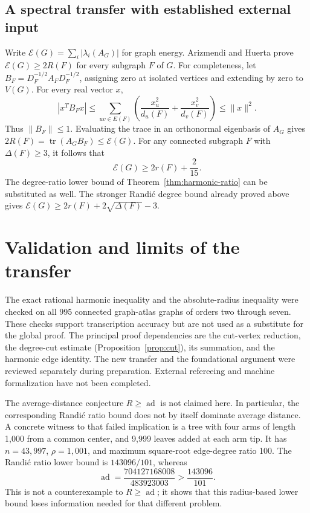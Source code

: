 \documentclass[11pt,a4paper]{article}
\begin{document}
\subsection{A spectral transfer with established external input}
Write $\mathcal E(G)=\sum_i|\lambda_i(A_G)|$ for graph energy.
Arizmendi and Huerta \cite{AH} prove
$\mathcal E(G)\ge2R(F)$ for every subgraph $F$ of $G$.
For completeness, let $B_F=D_F^{-1/2}A_FD_F^{-1/2}$, assigning
zero at isolated vertices and extending by zero to $V(G)$.
For every real vector $x$,
\[
|x^TB_Fx|\le\sum_{uv\in E(F)}
\left(\frac{x_u^2}{d_u(F)}+\frac{x_v^2}{d_v(F)}\right)
\le\|x\|^2.
\]
Thus $\|B_F\|\le1$. Evaluating the trace in an orthonormal
eigenbasis of $A_G$ gives
$2R(F)=\operatorname{tr}(A_GB_F)\le\mathcal E(G)$.
For any connected subgraph $F$ with $\Delta(F)\ge3$, it follows that
\[
\mathcal E(G)\ge2r(F)+\frac2{15}.
\]
The degree-ratio lower bound of Theorem~\ref{thm:harmonic-ratio}
can be substituted as well. The stronger Randi\'c degree bound
already proved above gives
$\mathcal E(G)\ge2r(F)+2\sqrt{\Delta(F)}-3$.

\section{Validation and limits of the transfer}
The exact rational harmonic inequality and the absolute-radius
inequality were checked on all 995 connected graph-atlas graphs
of orders two through seven. These checks support transcription
accuracy but are not used as a substitute for the global proof.
The principal proof dependencies are the cut-vertex reduction,
the degree-cut estimate (Proposition~\ref{prop:cut}), its summation,
and the harmonic edge identity. The new transfer and the foundational
argument were reviewed separately during preparation. External
refereeing and machine formalization have not been completed.

The average-distance conjecture $R\ge\operatorname{ad}$ is not
claimed here. In particular, the corresponding Randi\'c ratio bound
does not by itself dominate average distance. A concrete witness
to that failed implication is a tree with four arms of length 1,000
from a common center, and 9,999 leaves added at each arm tip.
It has $n=43,997$, $\rho=1,001$, and maximum square-root edge-degree
ratio 100. The Randi\'c ratio lower bound is $143096/101$, whereas
\[
\operatorname{ad}=
\frac{704127168008}{483923003}
>\frac{143096}{101}.
\]
This is not a counterexample to $R\ge\operatorname{ad}$; it shows
that this radius-based lower bound loses information needed for
that different problem.
\end{document}
